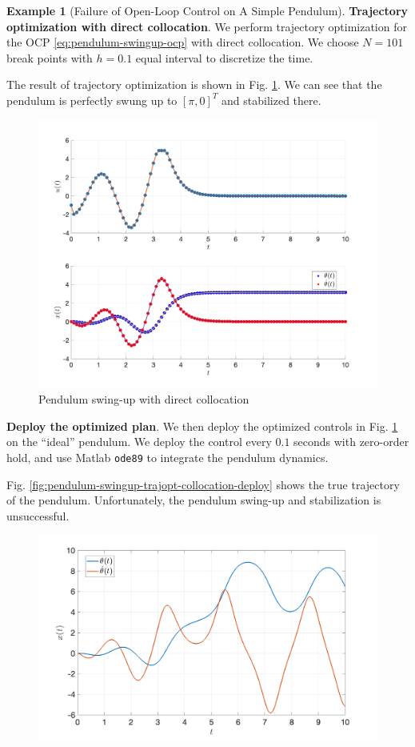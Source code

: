 \documentclass[
]{book}
\theoremstyle{definition}
\theoremstyle{definition}
\newtheorem{example}{Example}[chapter]
\theoremstyle{definition}
\theoremstyle{definition}
\theoremstyle{remark}
\begin{document}
\begin{example}[Failure of Open-Loop Control on A Simple Pendulum]
\textbf{Trajectory optimization with direct collocation}. We perform trajectory optimization for the OCP \eqref{eq:pendulum-swingup-ocp} with direct collocation. We choose \(N=101\) break points with \(h=0.1\) equal interval to discretize the time.

The result of trajectory optimization is shown in Fig. \ref{fig:pendulum-swingup-trajopt-collocation}. We can see that the pendulum is perfectly swung up to \([\pi,0]^T\) and stabilized there.

\begin{figure}

{\centering \includegraphics[width=0.8\linewidth]{images/pendulum_trajopt_result} 

}

\caption{Pendulum swing-up with direct collocation}\label{fig:pendulum-swingup-trajopt-collocation}
\end{figure}

\textbf{Deploy the optimized plan}. We then deploy the optimized controls in Fig. \ref{fig:pendulum-swingup-trajopt-collocation} on the ``ideal'' pendulum. We deploy the control every \(0.1\) seconds with zero-order hold, and use Matlab \texttt{ode89} to integrate the pendulum dynamics.

Fig. \ref{fig:pendulum-swingup-trajopt-collocation-deploy} shows the true trajectory of the pendulum. Unfortunately, the pendulum swing-up and stabilization is unsuccessful.

\begin{figure}

{\centering \includegraphics[width=0.8\linewidth]{images/pendulum_trajopt_deploy} 

}
\end{figure}
\end{example}
\end{document}
